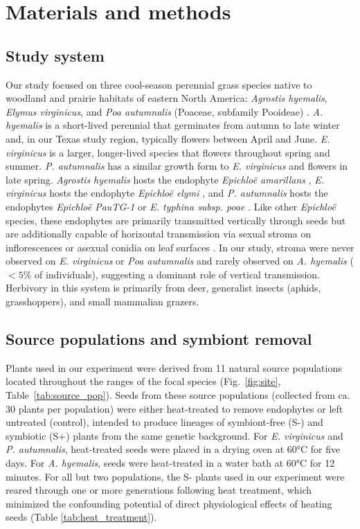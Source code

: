 \documentclass[12pt]{article}\usepackage[]{graphicx}\usepackage[dvipsnames]{xcolor}
\begin{document}
\section*{Materials and methods}
\subsection*{Study system}
Our study focused on three cool-season perennial grass species native to woodland and prairie habitats of eastern North America: \emph{Agrostis hyemalis}, \emph{Elymus virginicus}, and \emph{Poa autumnalis} (Poaceae, subfamily Pooideae) \citep{shaw2011guide}.
\emph{A. hyemalis} is a short-lived perennial that germinates from autumn to late winter and, in our Texas study region, typically flowers between April and June. 
\emph{E. virginicus} is a larger, longer-lived species that flowers throughout spring and summer. 
\emph{P. autumnalis} has a similar growth form to \emph{E. virginicus} and flowers in late spring. 
\emph{Agrostis hyemalis} hosts the endophyte \emph{Epichloë amarillans} \citep{white1994endophyte}, \emph{E. virginicus} hosts the endophyte \emph{Epichloë elymi} \citep{liu2023fungi}, and \emph{P. autumnalis} hosts the endophytes \emph{Epichloë PauTG-1} or \emph{E. typhina subsp. poae} \citep{gundel2020simulated}.
Like other \emph{Epichloë} species, these endophytes are primarily transmitted vertically through seeds but are additionally capable of horizontal transmission via sexual stroma on inflorescences or asexual conidia on leaf surfaces \citep{clay2002evolutionary, gundel2020simulated,leuchtmann2014nomenclatural}. 
In our study, stroma were never observed on \emph{E. virginicus} or \emph{Poa autumnalis} and rarely observed on \emph{A. hyemalis} ($<5\%$ of individuals), suggesting a dominant role of vertical transmission.
Herbivory in this system is primarily from deer, generalist insects (aphids, grasshoppers), and small mammalian grazers. 

\subsection*{Source populations and symbiont removal}
Plants used in our experiment were derived from 11 natural source populations located throughout the ranges of the focal species (Fig.~\ref{fig:site}, Table~\ref{tab:source_pop}). 
Seeds from these source populations (collected from ca. 30 plants per population) were either heat-treated to remove endophytes or left untreated (control), intended to produce lineages of symbiont-free (S-) and symbiotic (S+) plants from the same genetic background. 
For \emph{E. virginicus} and \emph{P. autumnalis}, heat-treated seeds were placed in a drying oven at 60°C for five days. 
For \emph{A. hyemalis}, seeds were heat-treated in a water bath at 60°C for 12 minutes.
For all but two populations, the S- plants used in our experiment were reared through one or more generations following heat treatment, which minimized the confounding potential of direct physiological effects of heating seeds (Table \ref{tab:heat_treatment}). 
\end{document}

